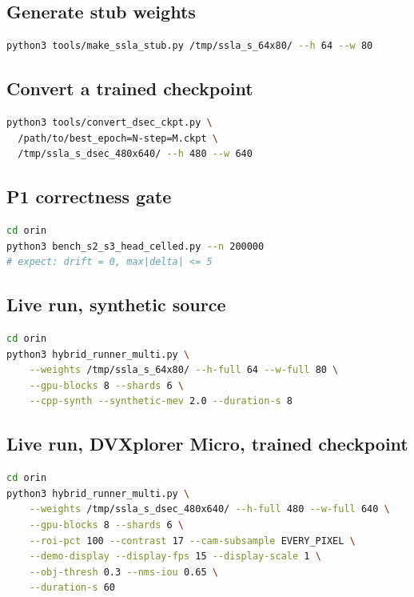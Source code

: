 \documentclass[11pt,a4paper]{article}
\begin{document}
\subsection{Generate stub weights}

\begin{lstlisting}[language=Bash]
python3 tools/make_ssla_stub.py /tmp/ssla_s_64x80/ --h 64 --w 80
\end{lstlisting}

\subsection{Convert a trained checkpoint}

\begin{lstlisting}[language=Bash]
python3 tools/convert_dsec_ckpt.py \
  /path/to/best_epoch=N-step=M.ckpt \
  /tmp/ssla_s_dsec_480x640/ --h 480 --w 640
\end{lstlisting}

\subsection{P1 correctness gate}

\begin{lstlisting}[language=Bash]
cd orin
python3 bench_s2_s3_head_celled.py --n 200000
# expect: drift = 0, max|delta| <= 5
\end{lstlisting}

\subsection{Live run, synthetic source}

\begin{lstlisting}[language=Bash]
cd orin
python3 hybrid_runner_multi.py \
    --weights /tmp/ssla_s_64x80/ --h-full 64 --w-full 80 \
    --gpu-blocks 8 --shards 6 \
    --cpp-synth --synthetic-mev 2.0 --duration-s 8
\end{lstlisting}

\subsection{Live run, DVXplorer Micro, trained checkpoint}

\begin{lstlisting}[language=Bash]
cd orin
python3 hybrid_runner_multi.py \
    --weights /tmp/ssla_s_dsec_480x640/ --h-full 480 --w-full 640 \
    --gpu-blocks 8 --shards 6 \
    --roi-pct 100 --contrast 17 --cam-subsample EVERY_PIXEL \
    --demo-display --display-fps 15 --display-scale 1 \
    --obj-thresh 0.3 --nms-iou 0.65 \
    --duration-s 60
\end{lstlisting}
\end{document}
